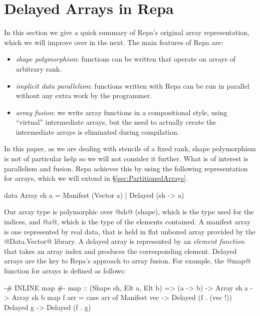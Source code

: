 
\section{Delayed Arrays in Repa}
\label{sec:Repa}
In this section we give a quick summary of Repa's original array representation, which we will improve over in the next. The main features of Repa are:

\begin{itemize}
\item \emph{shape polymorphism}: functions can be written that operate on arrays of arbitrary rank.

\item \emph{implicit data parallelism}: functions written with Repa can be run in parallel without any extra work by the programmer.

\item \emph{array fusion}: we write array functions in a compositional style, using ``virtual'' intermediate arrays, but the need to actually create the intermediate arrays is eliminated during compilation. 
\end{itemize}

In this paper, as we are dealing with stencils of a fixed rank, shape polymorphism is not of particular help so we will not consider it further. What is of interest is parallelism and fusion. Repa achieves this by using the following representation for arrays, which we will extend in \S\ref{sec:PartitionedArrays}.

\begin{code}
  data Array sh a
        = Manifest (Vector a)
        | Delayed  (sh -> a)
\end{code}

Our array type is polymorphic over @sh@ (shape), which is the type used for the indices, and @a@, which is the type of the elements contained. A manifest array is one represented by real data, that is held in flat unboxed array provided by the @Data.Vector@ library. A delayed array is represented by an \emph{element function} that takes an array index and produces the corresponding element. Delayed arrays are the key to Repa's approach to array fusion. For example, the @map@ function for arrays is defined as follows:

\begin{code}
 {-# INLINE map #-}
 map :: (Shape sh, Elt a, Elt b)
     => (a -> b) -> Array sh a -> Array sh b
 map f arr
  = case arr of
     Manifest vec  -> Delayed (f . (vec !))
     Delayed  g    -> Delayed (f . g)
\end{code}


